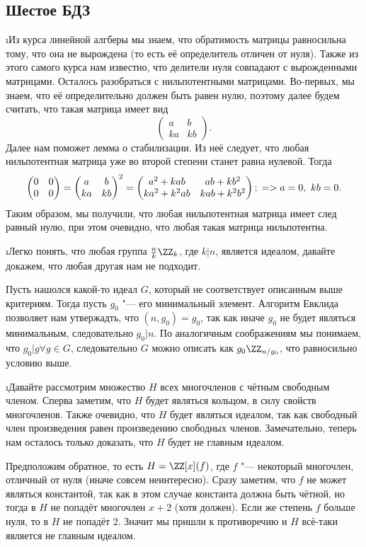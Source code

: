 \subsection{Шестое БДЗ}

\i Из курса линейной алгберы мы знаем, что обратимость матрицы равносильна тому, что она не вырождена (то есть её определитель отличен от нуля). Также из этого самого курса нам известно, что делители нуля совпадают с вырожденными матрицами. Осталось разобраться с нильпотентными матрицами. Во-первых, мы знаем, что её определительно должен быть равен нулю, поэтому далее будем считать, что такая матрица имеет вид 
$$
\begin{pmatrix}
a & b \\
ka & kb
\end{pmatrix}.
$$
Далее нам поможет лемма о стабилизации. Из неё следует, что любая нильпотентная матрица уже во второй степени станет равна нулевой. Тогда
$$
\begin{pmatrix}
    0 & 0 \\ 0 & 0
\end{pmatrix} = \begin{pmatrix}
    a & b \\
    ka & kb
\end{pmatrix}^2 = \begin{pmatrix}
    a^2 + kab & ab + kb^2\\
    ka^2 + k^2ab & kab + k^2b^2
\end{pmatrix};\\
=> a = 0,\ kb = 0.
$$
Таким образом, мы получили, что любая нильпотентная матрица имеет след равный нулю, при этом очевидно, что любая такая матрица нильпотентна.

\i Легко понять, что любая группа $\frac{n}{k}\ZZ_k$, где $k | n$, является идеалом, давайте докажем, что любая другая нам не подходит.
\par Пусть нашолся какой-то идеал $G$, который не соответствует описанным выше критериям. Тогда пусть $g_0$ "--- его минимальный элемент. Алгоритм Евклида позволяет нам утвержадть, что $(n, g_0) = g_0$, так как иначе $g_0$ не будет являться минимальным, следовательно $g_0 | n$. По аналогичным соображениям мы понимаем, что $g_0 | g \forall g \in G$, следовательно $G$ можно описать как $g_0\ZZ_{n/g_0}$, что равносильно условию выше.

\i Давайте рассмотрим множество $H$ всех многочленов с чётным свободным членом. Сперва заметим, что $H$ будет являться кольцом, в силу свойств многочленов. Также очевидно, что $H$ будет являться идеалом, так как свободный член произведения равен произведению свободных членов. Замечательно, теперь нам осталось только доказать, что $H$ будет не главным идеалом.
\par Предположим обратное, то есть $H = \ZZ[x](f)$, где $f$ "--- некоторый многочлен, отличный от нуля (иначе совсем неинтересно). Сразу заметим, что $f$ не может являться константой, так как в этом случае константа должна быть чётной, но тогда в $H$ не попадёт многочлен $x + 2$ (хотя должен). Если же степень $f$ больше нуля, то в $H$ не попадёт $2$. Значит мы пришли к противоречию и $H$ всё-таки является не главным идеалом.

